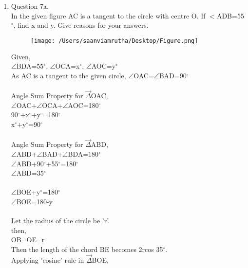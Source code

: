 \documentclass[journal,12pt,twocolumn]{IEEEtran}
\renewcommand\thesection{\arabic{section}}
\begin{document}
\section{}
\begin{enumerate}[label=\thesection.\arabic*.,ref=\thesection.\theenumi]

\item Question 7a.\\ In the given figure AC is a tangent to the circle with centre O. If $<$ADB=55$^{\circ}$, find x and y. Give reasons for your answers.\\
\begin{figure}[htbp]
\texttt{[image: /Users/saanviamrutha/Desktop/Figure.png]}
\label{fig}
\end{figure}

\solution 
Given,\\
 $\angle$BDA=55$^{\circ}$, $\angle$OCA=x$^{\circ}$, $\angle$AOC=y$^{\circ}$\\

As AC is a tangent to the given circle, $\angle$OAC=$\angle$BAD=90$^{\circ}$\\
\\
Angle Sum Property for $\vec{\Delta}$OAC, \\
               $\angle$OAC+$\angle$OCA+$\angle$AOC=180$^{\circ}$\\
               90$^{\circ}$+x$^{\circ}$+y$^{\circ}$=180$^{\circ}$\\
               x$^{\circ}$+y$^{\circ}$=90$^{\circ}$\\
               \\ 
Angle Sum Property for $\vec{\Delta}$ABD, \\   
               $\angle$ABD+$\angle$BAD+$\angle$BDA=180$^{\circ}$\\
               $\angle$ABD+90$^{\circ}$+55$^{\circ}$=180$^{\circ}$\\
               $\angle$ABD=35$^{\circ}$\\ \\
                
                $\angle$BOE+y$^{\circ}$=180$^{\circ}$\\
                $\angle$BOE=180-y\\ \\
                Let the radius of the circle be 'r'.\\
                then,\\
                OB=OE=r\\
                Then the length of the chord BE becomes 2rcos 35$^{\circ}$.\\
                Applying 'cosine' rule in $\vec{\Delta}$BOE,\\ 
              

\end{enumerate}
\end{document}
